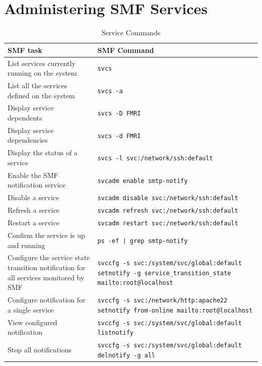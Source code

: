 \documentclass[10pt,a4paper,twoside]{report}
\begin{document}
\section{Administering SMF Services}
\begin{table}[htbp]
\begin{tabular}{|p{}|p{}|}
\hline
\rowcolor{LightBlue}
 \textbf{SMF task}& \textbf{SMF Command} \\
\hline
\rowcolor{LightYellow}
List services currently running on the system & \verb+svcs+\\
\hline
\rowcolor{LightYellow}
List all the services defined on the system & \verb+svcs -a+\\
\hline
\rowcolor{LightYellow}
Display service dependents & \verb+svcs -D FMRI+\\
\hline
\rowcolor{LightYellow}
Display service dependencies & \verb+svcs -d FMRI+\\
\hline
\rowcolor{LightYellow}
Display the status of a service & \verb+svcs -l svc:/network/ssh:default+\\
\hline
\rowcolor{LightYellow}
Enable the SMF notification service & \verb+svcadm enable smtp-notify+\\
\hline
\rowcolor{LightYellow}
Disable a service & \verb+svcadm disable svc:/network/ssh:default+\\
\hline
\rowcolor{LightYellow}
Refresh a service & \verb+svcadm refresh svc:/network/ssh:default+\\
\hline
\rowcolor{LightYellow}
Restart a service & \verb+svcadm restart svc:/network/ssh:default+\\
\hline
\rowcolor{LightYellow}
Confirm the service is up and running & \verb+ps -ef | grep smtp-notify+\\
\hline
\rowcolor{LightYellow}
Configure the service state transition notification for all services monitored by SMF & \verb+svccfg -s svc:/system/svc/global:default+ \verb+setnotify -g service_transition_state+ \verb+mailto:root@localhost+\\
\hline
\rowcolor{LightYellow}
Configure notification for a single service & \verb+svccfg -s svc:/network/http:apache22+ \verb+ setnotify from-online mailto:root@localhost+\\
\hline
\rowcolor{LightYellow}
View configured notification & \verb+svccfg -s svc:/system/svc/global:default+ \verb+listnotify+\\
\hline
\rowcolor{LightYellow}
Stop all notifications & \verb+svccfg -s svc:/system/svc/global:default+ \verb+delnotify -g all+\\
\hline
\end{tabular}
\caption{Service Commands}
\end{table}
\end{document}
